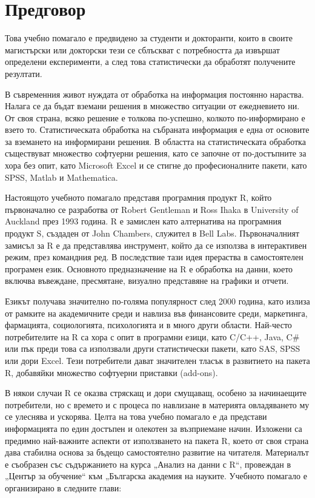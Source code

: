 \newpage
{}
\chapter*{Предговор}
\setcounter{page}{1}
\thispagestyle{empty}

Това учебно помагало е предвидено за студенти и докторанти, които в своите магистърски или докторски тези се сблъскват с потребността да извършат определени експерименти, а след това статистически да обработят получените резултати.

В съвременния живот нуждата от обработка на информация постоянно нараства. Налага се да бъдат вземани решения в множество ситуации от ежедневието ни. От своя страна, всяко решение е толкова по-успешно, колкото по-информирано е взето то. Статистическата обработка на събраната информация е една от основите за вземането на информирани решения. В областта на статистическата обработка съществуват множество софтуерни решения, като се започне от по-достъпните за хора без опит, като Microsoft Excel и се стигне до професионалните пакети, като SPSS\cite{spss}, Matlab\cite{matlab} и Mathematica\cite{mathematica}.

Настоящото учебното помагало представя програмния продукт R, който първоначално се разработва от Robert Gentleman и Ross Ihaka в University of Auckland през 1993 година. R е замислен като алтернатива на програмния продукт S, създаден от John Chambers, служител в Bell Labs. Първоначалният замисъл за R е да представлява инструмент, който да се използва в интерактивен режим, през командния ред. В последствие тази идея прераства в самостоятелен програмен език. Основното предназначение на R е обработка на данни, което включва въвеждане, пресмятане, визуално представяне на графики и отчети.

Езикът получава значително по-голяма популярност след 2000 година, като излиза от рамките на академичните среди и навлиза във финансовите среди, маркетинга, фармацията, социологията, психологията и в много други области. Най-често потребителите на R са хора с опит в програмни езици, като C/C++\cite{cpp}, Java\cite{java}, C\#\cite{csharp} или пък преди това са използвали други статистически пакети, като SAS\cite{sas}, SPSS или дори Excel. Тези потребители дават значителен тласък в развитието на пакета R, добавяйки множество софтуерни приставки (add-ons).

В някои случаи R се оказва стряскащ и дори смущаващ, особено за начинаещите потребители, но с времето и с процеса по навлизане в материята овладяването му се улеснява и ускорява. Целта на това учебно помагало е да представи информацията по един достъпен и олекотен за възприемане начин. Изложени са предимно най-важните аспекти от използването на пакета R, което от своя страна дава стабилна основа за бъдещо самостоятелно развитие на читателя. Материалът е съобразен със съдържанието на курса „Анализ на данни с R“, провеждан в „Център за обучение“ към „Българска академия на науките. Учебното помагало е организирано в следните глави:

